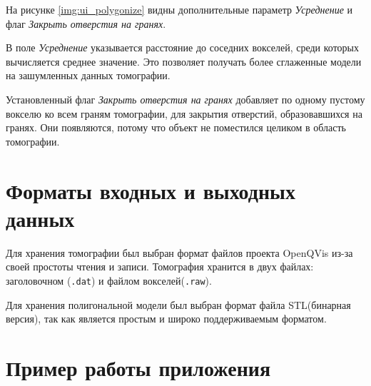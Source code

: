 

\clearpage

На рисунке \ref{img:ui_polygonize} видны дополнительные параметр \textit{Усреднение} и флаг \textit{Закрыть отверстия на гранях}.

В поле \textit{Усреднение} указывается расстояние до соседних вокселей, среди которых вычисляется среднее значение. Это позволяет получать более сглаженные модели на зашумленных данных томографии. 

Установленный флаг \textit{Закрыть отверстия на гранях} добавляет по одному пустому вокселю ко всем граням томографии, для закрытия отверстий, образовавшихся на гранях. Они появляются, потому что объект не поместился целиком в область томографии.


\clearpage


\section{Форматы входных и выходных данных}

Для хранения томографии был выбран формат файлов проекта OpenQVis\cite{file_oqvis} из-за своей простоты чтения и записи. Томография хранится в двух файлах: заголовочном (\texttt{.dat}) и файлом вокселей(\texttt{.raw}).

Для хранения полигональной модели был выбран формат файла STL(бинарная версия)\cite{file_stl}, так как является простым и широко поддерживаемым форматом.

\clearpage

\section{Пример работы приложения}


